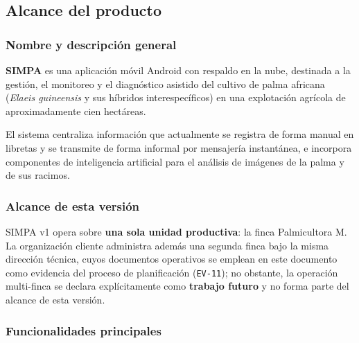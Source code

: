 \documentclass[11pt,a4paper]{article}
\newcommand{\id}[1]{\texttt{\begingroup\hyphenpenalty=10000\relax#1\endgroup}}
\renewcommand{\id}[1]{\texttt{#1}}
\begin{document}
\subsection{Alcance del producto}

\subsubsection{Nombre y descripción general}

\textbf{SIMPA} es una aplicación móvil Android con respaldo en la nube, destinada a la gestión,
el monitoreo y el diagnóstico asistido del cultivo de palma africana (\emph{Elaeis guineensis} y
sus híbridos interespecíficos) en una explotación agrícola de aproximadamente cien hectáreas.

El sistema centraliza información que actualmente se registra de forma manual en libretas y se
transmite de forma informal por mensajería instantánea, e incorpora componentes de inteligencia
artificial para el análisis de imágenes de la palma y de sus racimos.

\subsubsection{Alcance de esta versión}

SIMPA v1 opera sobre \textbf{una sola unidad productiva}: la finca Palmicultora M. La organización
cliente administra además una segunda finca bajo la misma dirección técnica, cuyos documentos
operativos se emplean en este documento como evidencia del proceso de planificación
(\id{EV-11}); no obstante, la operación multi-finca se declara explícitamente como
\textbf{trabajo futuro} y no forma parte del alcance de esta versión.

\subsubsection{Funcionalidades principales}
\end{document}
